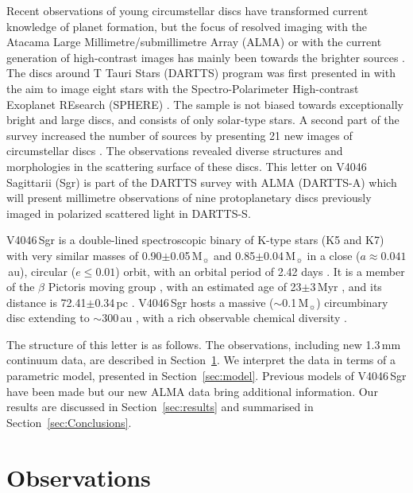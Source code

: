 \documentclass[letters,usenatbib,times]{mnras}
\begin{document}
Recent observations of young circumstellar discs have transformed current knowledge of planet formation, but the focus of resolved imaging with the Atacama Large Millimetre/submillimetre Array (ALMA) or with 
the current generation of high-contrast images 
has mainly been towards the brighter sources \citep{Andrews2020arXiv200105007A}. The discs around T Tauri Stars (DARTTS) program was first presented in \citet{Avenhaus_2018} with the aim to image eight stars with the Spectro-Polarimeter High-contrast Exoplanet REsearch (SPHERE) \citep{2019A&A...631A.155B}. The sample is not biased towards exceptionally bright and large discs, and consists of only solar-type stars. A second part of the survey increased the number of sources by presenting 21 new images of circumstellar discs \citep{Garufi2020}. The observations revealed diverse structures and morphologies in the scattering surface of these discs. This letter on V4046 Sagittarii (Sgr) is part of the DARTTS survey with ALMA (DARTTS-A) which will present millimetre observations of nine protoplanetary discs previously imaged in polarized scattered light in DARTTS-S. 

V4046\,Sgr is a double-lined spectroscopic binary of K-type stars (K5 and K7) with very similar masses of 0.90$\pm$0.05\,M$_{\sun}$ and 0.85$\pm$0.04\,M$_{\sun}$ \citep{Rosenfeld_2012} in a close ($a \approx 0.041$\,au), circular ($e\leq0.01$) orbit, with an orbital period of 2.42 days \citep{refId0}. It is a member of the $\beta$ Pictoris moving group \citep{Zuckerman_2004}, with an estimated age of 23$\pm$3\,Myr \citep{Mamajek_2014}, and its distance is 72.41$\pm$0.34\,pc \citep{Gaia}. V4046\,Sgr hosts a massive ($\sim$0.1\,M$_{\sun}$) circumbinary disc extending to $\sim$300\,au \citep{Rosenfeld_2013, Rodriguez_2010}, with a rich observable chemical diversity \citep{Kastner_2018}. 

The structure of this letter is as follows. The observations, including new 1.3\,mm continuum data, are described in Section~\ref{sec:Observations}. We interpret the data in terms of a parametric model, presented in Section~\ref{sec:model}. Previous models of V4046\,Sgr have been made \citep{Ru_z_Rodr_guez_2019, Rosenfeld_2013, 2019ApJ...882..160Q} but our new ALMA data bring additional information. Our results are discussed in Section~\ref{sec:results} and summarised in Section~\ref{sec:Conclusions}.

\section{Observations} \label{sec:Observations}
\end{document}
